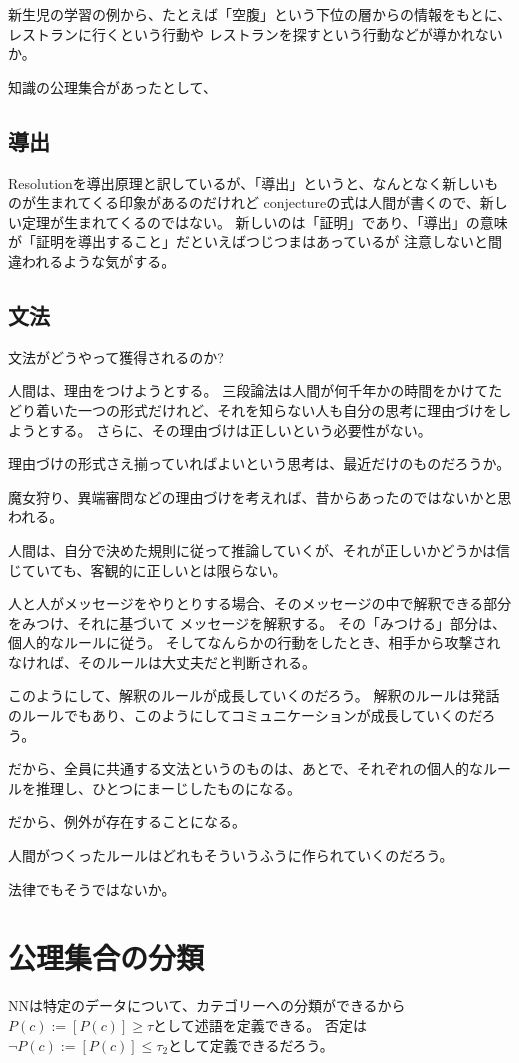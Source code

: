 \documentclass[10pt, oneside]{jarticle}   	%
\begin{document}
新生児の学習の例から、たとえば「空腹」という下位の層からの情報をもとに、レストランに行くという行動や
レストランを探すという行動などが導かれないか。

知識の公理集合があったとして、

\subsection{導出}
Resolutionを導出原理と訳しているが、「導出」というと、なんとなく新しいものが生まれてくる印象があるのだけれど
conjectureの式は人間が書くので、新しい定理が生まれてくるのではない。
新しいのは「証明」であり、「導出」の意味が「証明を導出すること」だといえばつじつまはあっているが
注意しないと間違われるような気がする。

\subsection{文法}
文法がどうやって獲得されるのか?

人間は、理由をつけようとする。
三段論法は人間が何千年かの時間をかけてたどり着いた一つの形式だけれど、それを知らない人も自分の思考に理由づけをしようとする。
さらに、その理由づけは正しいという必要性がない。

理由づけの形式さえ揃っていればよいという思考は、最近だけのものだろうか。

魔女狩り、異端審問などの理由づけを考えれば、昔からあったのではないかと思われる。

人間は、自分で決めた規則に従って推論していくが、それが正しいかどうかは信じていても、客観的に正しいとは限らない。

人と人がメッセージをやりとりする場合、そのメッセージの中で解釈できる部分をみつけ、それに基づいて
メッセージを解釈する。
その「みつける」部分は、個人的なルールに従う。
そしてなんらかの行動をしたとき、相手から攻撃されなければ、そのルールは大丈夫だと判断される。

このようにして、解釈のルールが成長していくのだろう。
解釈のルールは発話のルールでもあり、このようにしてコミュニケーションが成長していくのだろう。

だから、全員に共通する文法というのものは、あとで、それぞれの個人的なルールを推理し、ひとつにまーじしたものになる。

だから、例外が存在することになる。

人間がつくったルールはどれもそういうふうに作られていくのだろう。

法律でもそうではないか。

\section{公理集合の分類}
NNは特定のデータについて、カテゴリーへの分類ができるから$P(c) := [P(c)] \geq \tau$として述語を定義できる。
否定は$\neg P(c) := [P(c)] \leq \tau_2$として定義できるだろう。
\end{document}
